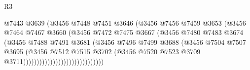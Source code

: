 \begin{lexlean}{R3}
\begin{coremodule}
                                            @7443
                                            @3639
                                            (@3456
                                              @7448
                                              @7451
                                              @3646
                                              (@3456
                                                @7456
                                                @7459
                                                @3653
                                                (@3456
                                                  @7464
                                                  @7467
                                                  @3660
                                                  (@3456
                                                    @7472
                                                    @7475
                                                    @3667
                                                    (@3456
                                                      @7480
                                                      @7483
                                                      @3674
                                                      (@3456
                                                        @7488
                                                        @7491
                                                        @3681
                                                        (@3456
                                                          @7496
                                                          @7499
                                                          @3688
                                                          (@3456
                                                            @7504
                                                            @7507
                                                            @3695
                                                            (@3456
                                                              @7512
                                                              @7515
                                                              @3702
                                                              (@3456
                                                                @7520
                                                                @7523
                                                                @3709
                                                                @3711))))))))))))))))))))))))))))))

\end{coremodule}
\end{lexlean}
